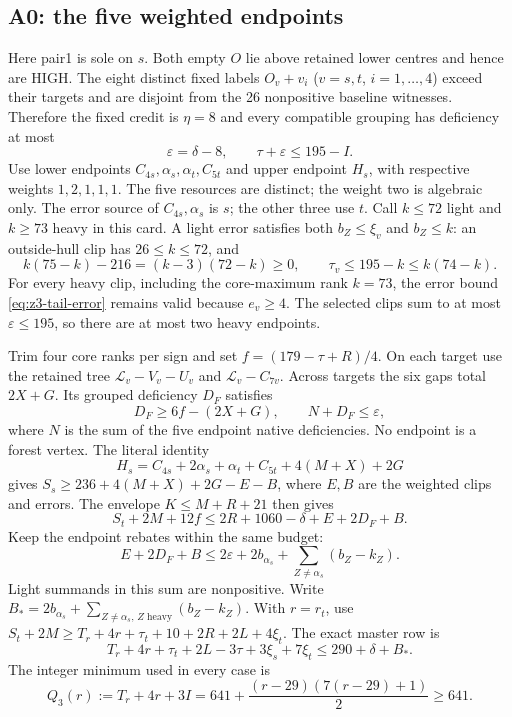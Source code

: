 \documentclass[11pt,letterpaper]{article}
\theoremstyle{definition}\newtheorem{definition}[theorem]{Definition}
\begin{document}
\subsection{A0: the five weighted endpoints}
Here pair1 is sole on $s$. Both empty $O$ lie above retained lower centres and hence are HIGH. The eight distinct fixed labels $O_v+v_i$ ($v=s,t$, $i=1,\ldots,4$) exceed their targets and are disjoint from the 26 nonpositive baseline witnesses. Therefore the fixed credit is $\eta=8$ and every compatible grouping has deficiency at most
\[
 \varepsilon=\delta-8,\qquad \tau+\varepsilon\le195-I.
\]
Use lower endpoints $C_{4s},\alpha_s,\alpha_t,C_{5t}$ and upper endpoint $H_s$, with respective weights $1,2,1,1,1$. The five resources are distinct; the weight two is algebraic only. The error source of $C_{4s},\alpha_s$ is $s$; the other three use $t$. Call $k\le72$ light and $k\ge73$ heavy in this card. A light error satisfies both $b_Z\le\xi_v$ and $b_Z\le k$: an outside-hull clip has $26\le k\le72$, and
\[
 k(75-k)-216=(k-3)(72-k)\ge0,
 \qquad \tau_v\le195-k\le k(74-k).
\]
For every heavy clip, including the core-maximum rank $k=73$, the error bound \eqref{eq:z3-tail-error} remains valid because $e_v\ge4$. The selected clips sum to at most $\varepsilon\le195$, so there are at most two heavy endpoints.

Trim four core ranks per sign and set $f=(179-\tau+R)/4$. On each target use the retained tree $\mathcal L_v-V_v-U_v$ and $\mathcal L_v-C_{7v}$. Across targets the six gaps total $2X+G$. Its grouped deficiency $D_F$ satisfies
\[
 D_F\ge6f-(2X+G),\qquad N+D_F\le\varepsilon,
\]
where $N$ is the sum of the five endpoint native deficiencies. No endpoint is a forest vertex. The literal identity
\[
 H_s=C_{4s}+2\alpha_s+\alpha_t+C_{5t}+4(M+X)+2G
\]
gives $S_s\ge236+4(M+X)+2G-E-B$, where $E,B$ are the weighted clips and errors. The envelope $K\le M+R+21$ then gives
\[
 S_t+2M+12f\le2R+1060-\delta+E+2D_F+B.
\]
Keep the endpoint rebates within the same budget:
\[
 E+2D_F+B\le2\varepsilon+2b_{\alpha_s}
       +\sum_{Z\ne\alpha_s}(b_Z-k_Z).
\]
Light summands in this sum are nonpositive. Write
$B_* =2b_{\alpha_s}+\sum_{Z\ne\alpha_s,\, Z\text{ heavy}}(b_Z-k_Z)$.
With $r=r_t$, use
$S_t+2M\ge T_r+4r+\tau_t+10+2R+2L+4\xi_t$.
The exact master row is
\begin{equation}\label{eq:z3a0master}
 T_r+4r+\tau_t+2L-3\tau+3\xi_s+7\xi_t
 \le290+\delta+B_*.
\end{equation}
The integer minimum used in every case is
\begin{equation}\label{eq:z3-min3}
 Q_3(r):=T_r+4r+3I=641+\frac{(r-29)(7(r-29)+1)}2\ge641.
\end{equation}
\end{document}
